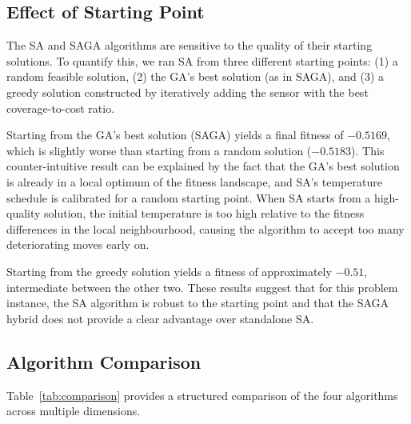 \documentclass[12pt,a4paper]{article}
\begin{document}
\subsection{Effect of Starting Point}

The SA and SAGA algorithms are sensitive to the quality of their starting solutions.
To quantify this, we ran SA from three different starting points: (1) a random feasible solution, (2) the GA's best solution (as in SAGA), and (3) a greedy solution constructed by iteratively adding the sensor with the best coverage-to-cost ratio.

Starting from the GA's best solution (SAGA) yields a final fitness of $-0.5169$, which is slightly worse than starting from a random solution ($-0.5183$).
This counter-intuitive result can be explained by the fact that the GA's best solution is already in a local optimum of the fitness landscape, and SA's temperature schedule is calibrated for a random starting point.
When SA starts from a high-quality solution, the initial temperature is too high relative to the fitness differences in the local neighbourhood, causing the algorithm to accept too many deteriorating moves early on.

Starting from the greedy solution yields a fitness of approximately $-0.51$, intermediate between the other two.
These results suggest that for this problem instance, the SA algorithm is robust to the starting point and that the SAGA hybrid does not provide a clear advantage over standalone SA.

\subsection{Algorithm Comparison}

Table~\ref{tab:comparison} provides a structured comparison of the four algorithms across multiple dimensions.
\end{document}
